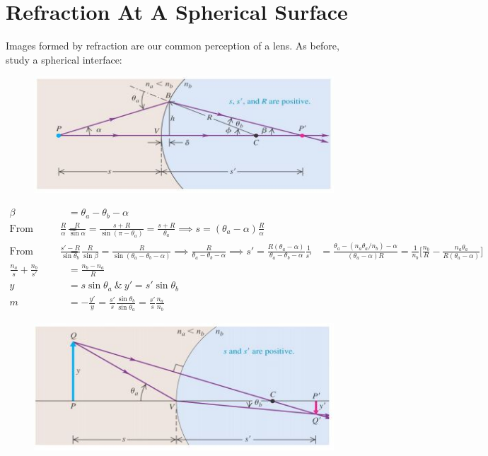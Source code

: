 \documentclass[a4paper, 11pt, normalem]{report}
\begin{document}
\section{Refraction At A Spherical Surface}
Images formed by refraction are our common perception of a lens.
As before, study a spherical interface: 
\begin{figure}[H]
    \centering
    \includegraphics{Refrac4.jpg}
\end{figure}
\begin{align}
    \beta &= \theta_{a} - \theta_{b} - \alpha \\
    \text{From PCB: }\frac{R}{\alpha} =& \frac{R}{\sin{\alpha}} = \frac{s + R}{\sin{(\pi - \theta_{a})}} = \frac{s + R}{\theta_{a}} \implies s = (\theta_{a} - \alpha)\frac{R}{\alpha} \\
    \text{From P'CB: }\frac{s' - R}{\sin{\theta_{b}}} &= \frac{R}{\sin{\beta}} = \frac{R}{\sin{(\theta_{a} - \theta_{b} - \alpha)}} \implies \frac{R}{\theta_{a} - \theta_{b} - \alpha} \implies s' = \frac{R(\theta_{a} - \alpha)}{\theta_{a} - \theta_{b} - \alpha}
    \frac{1}{s'} &= \frac{\theta_{a} - (n_{a}\theta_{a}/n_{b}) - \alpha}{(\theta_{a} - \alpha)R} = \frac{1}{n_{b}}\Big[\frac{n_{b}}{R} - \frac{n_{a}\theta_{a}}{R(\theta_{a} - \alpha)}\Big] \\
    \frac{n_{a}}{s} + \frac{n_{b}}{s'} &= \frac{n_{b} - n_{a}}{R} \\
    y &= s\sin{\theta_{a}} ~\&~ y' = s'\sin{\theta_{b}} \\
    m &= -\frac{y'}{y} = \frac{s'}{s}\frac{\sin{\theta_{b}}}{\sin{\theta_{a}}} = \frac{s'}{s}\frac{n_{a}}{n_{b}}
\end{align}
\begin{figure}[H]
    \centering
    \includegraphics{Refrac5.jpg}
\end{figure}
\end{document}
